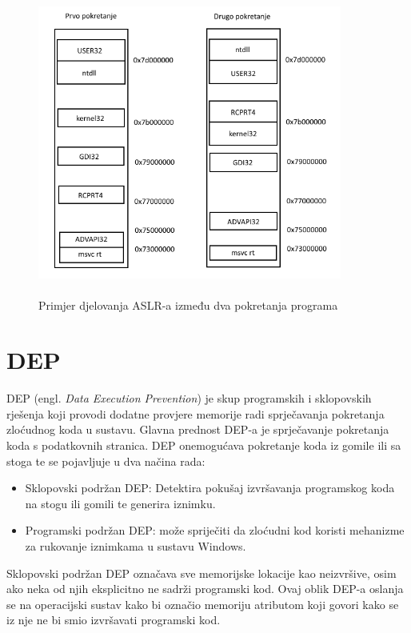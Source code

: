 \documentclass[times, utf8, diplomski, numeric]{fer}
\begin{document}
\begin{figure}[!ht]
\centering
\setlength\fboxsep{0pt}
\setlength\fboxrule{0.5pt}
\includegraphics[width=10cm, height=10cm]{slike/aslr_v2}
\caption{Primjer djelovanja ASLR-a između dva pokretanja programa}
\label{fig:aslr} 
\end{figure} 

\section{DEP}
\label{sct:dep}

DEP (engl. \emph{Data Execution Prevention}) je skup programskih i
sklopovskih rješenja koji provodi dodatne provjere memorije radi
sprječavanja pokretanja zloćudnog koda u sustavu. Glavna prednost
DEP-a je sprječavanje pokretanja koda s podatkovnih stranica.
DEP onemogućava pokretanje koda iz gomile ili sa stoga te se
pojavljuje u dva načina rada:

\begin{itemize}
\item Sklopovski podržan DEP: Detektira pokušaj izvršavanja programskog koda
 na stogu ili gomili te generira iznimku.
\item Programski podržan DEP: može spriječiti da zloćudni kod koristi mehanizme za rukovanje iznimkama u sustavu Windows.
\end{itemize}

Sklopovski podržan DEP označava sve memorijske lokacije kao neizvršive, 
osim ako neka od njih eksplicitno ne sadrži programski
kod. Ovaj oblik DEP-a oslanja se na operacijski sustav kako bi označio
memoriju atributom koji govori kako se iz nje ne bi smio
izvršavati programski kod.
\end{document}
